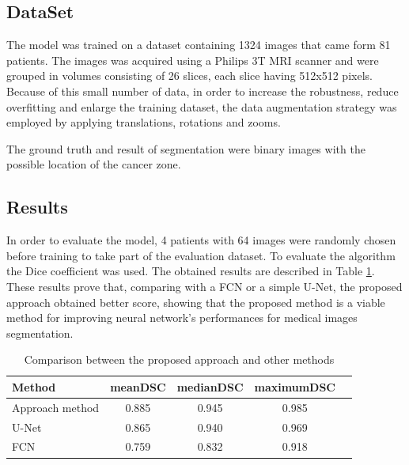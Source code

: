 \documentclass[runningheads,a4paper,11pt]{report}
\begin{document}
\subsection{DataSet}
\label{section:dataset}

The model was trained on a dataset containing 1324 images that came form 81 patients. The images was acquired using a Philips 3T MRI scanner and were grouped in volumes consisting of 26 slices, each slice having 512x512 pixels. Because of this small number of data, in order to increase the robustness, reduce overfitting and  enlarge the training dataset, the data augmentation strategy was employed by applying translations, rotations and zooms.\cite{deeplySupervisedCNN}

The ground truth and result of segmentation were binary images with the possible location of the cancer zone. \cite{deeplySupervisedCNN}

\subsection{Results}
\label{section:results}

In order to evaluate the model, 4
patients with 64 images were randomly chosen before training to take part of the evaluation dataset. To evaluate the algorithm the Dice coefficient was used. The obtained results are described in Table \ref{tab1Results}. These results prove that, comparing with a FCN or a simple U-Net, the proposed approach obtained better score, showing that the proposed method is a viable method for improving neural network's performances for medical images segmentation.\cite{deeplySupervisedCNN}

\begin{table}[htbp]
		\begin{center}
			\begin{tabular}{p{180pt}c c c c}
				\textbf{Method}&\textbf{meanDSC}& \textbf{medianDSC}&\textbf{maximumDSC} \\
				\hline\hline
 			Approach method& 0.885& 0.945& 0.985 \\
 			U-Net& 0.865& 0.940& 0.969 \\
 		    FCN& 0.759& 0.832& 0.918 \\
			\end{tabular}
		\end{center}
		\caption{Comparison between the proposed approach and other methods \cite{deeplySupervisedCNN}}
		\label{tab1Results}
\end{table}
\end{document}
